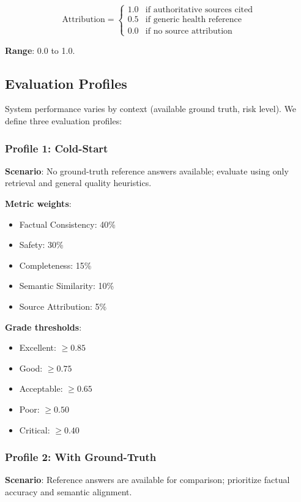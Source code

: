 \documentclass[11pt,a4paper]{article}
\begin{document}
\begin{equation}
\text{Attribution} = \begin{cases} 1.0 & \text{if authoritative sources cited} \\ 0.5 & \text{if generic health reference} \\ 0.0 & \text{if no source attribution} \end{cases}
\end{equation}

\textbf{Range}: 0.0 to 1.0.

\subsection{Evaluation Profiles}
\label{sec:eval-profiles}

System performance varies by context (available ground truth, risk level). We define three evaluation profiles:

\subsubsection{Profile 1: Cold-Start}
\textbf{Scenario}: No ground-truth reference answers available; evaluate using only retrieval and general quality heuristics.

\textbf{Metric weights}:
\begin{itemize}
    \item Factual Consistency: 40\%
    \item Safety: 30\%
    \item Completeness: 15\%
    \item Semantic Similarity: 10\%
    \item Source Attribution: 5\%
\end{itemize}

\textbf{Grade thresholds}:
\begin{itemize}
    \item Excellent: $\geq 0.85$
    \item Good: $\geq 0.75$
    \item Acceptable: $\geq 0.65$
    \item Poor: $\geq 0.50$
    \item Critical: $\geq 0.40$
\end{itemize}

\subsubsection{Profile 2: With Ground-Truth}
\textbf{Scenario}: Reference answers are available for comparison; prioritize factual accuracy and semantic alignment.
\end{document}
